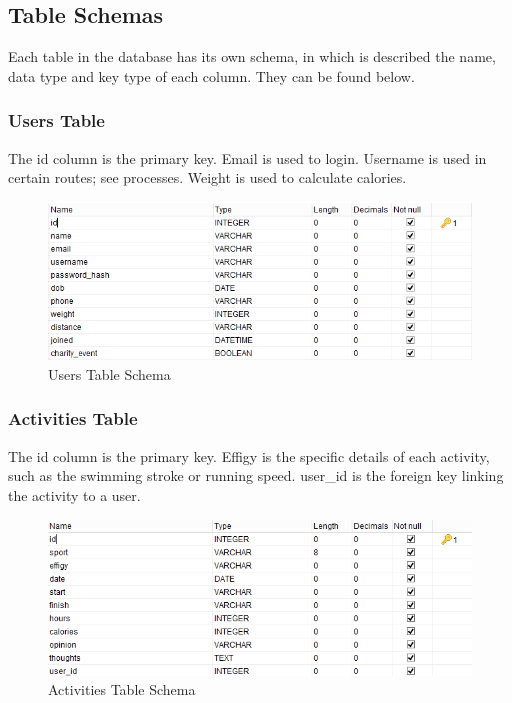 \documentclass{article}[12pt,a4paper]
\begin{document}
\clearpage

\subsection{Table Schemas}
Each table in the database has its own schema, in which is described the name, data type and key type of each column. They can be found below.

\subsubsection{Users Table}
The id column is the primary key. Email is used to login. Username is used in certain routes; see processes. Weight is used to calculate calories.
\begin{figure}[h!]
  \includegraphics[scale=0.65]{images/database/users_schema}
  \caption{Users Table Schema}
\end{figure}

\subsubsection{Activities Table}
The id column is the primary key. Effigy is the specific details of each activity, such as the swimming stroke or running speed. user\_id is the foreign key linking the activity to a user.
\begin{figure}[h!]
  \includegraphics[scale=0.65]{images/database/activities_schema}
  \caption{Activities Table Schema}
\end{figure}
\end{document}
